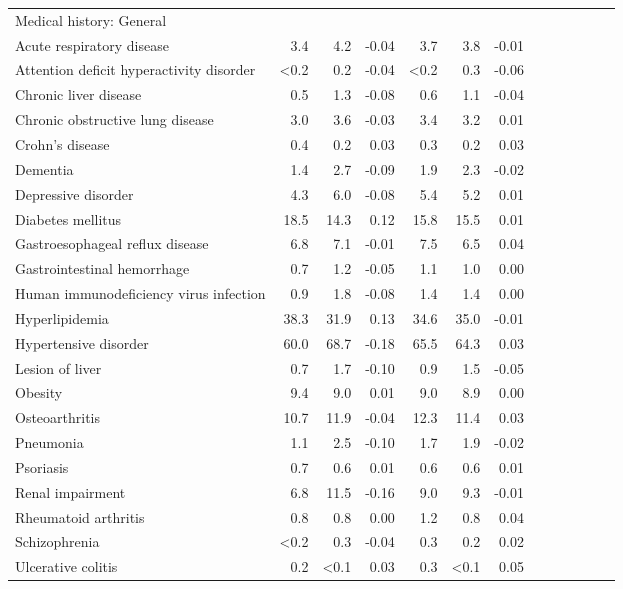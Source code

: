\documentclass[11pt,]{article}
\begin{document}
\begin{longtable}{lrrrrrrrrrrrr}
  Medical history: General &    &    &     &    &    &     \\ 
      Acute respiratory disease &  3.4 &  4.2 & -0.04 &  3.7 &  3.8 & -0.01 \\ 
      Attention deficit hyperactivity disorder & <0.2 &  0.2 & -0.04 & <0.2 &  0.3 & -0.06 \\ 
      Chronic liver disease &  0.5 &  1.3 & -0.08 &  0.6 &  1.1 & -0.04 \\ 
      Chronic obstructive lung disease &  3.0 &  3.6 & -0.03 &  3.4 &  3.2 &  0.01 \\ 
      Crohn's disease &  0.4 &  0.2 &  0.03 &  0.3 &  0.2 &  0.03 \\ 
      Dementia &  1.4 &  2.7 & -0.09 &  1.9 &  2.3 & -0.02 \\ 
      Depressive disorder &  4.3 &  6.0 & -0.08 &  5.4 &  5.2 &  0.01 \\ 
      Diabetes mellitus & 18.5 & 14.3 &  0.12 & 15.8 & 15.5 &  0.01 \\ 
      Gastroesophageal reflux disease &  6.8 &  7.1 & -0.01 &  7.5 &  6.5 &  0.04 \\ 
      Gastrointestinal hemorrhage &  0.7 &  1.2 & -0.05 &  1.1 &  1.0 &  0.00 \\ 
      Human immunodeficiency virus infection &  0.9 &  1.8 & -0.08 &  1.4 &  1.4 &  0.00 \\ 
      Hyperlipidemia & 38.3 & 31.9 &  0.13 & 34.6 & 35.0 & -0.01 \\ 
      Hypertensive disorder & 60.0 & 68.7 & -0.18 & 65.5 & 64.3 &  0.03 \\ 
      Lesion of liver &  0.7 &  1.7 & -0.10 &  0.9 &  1.5 & -0.05 \\ 
      Obesity &  9.4 &  9.0 &  0.01 &  9.0 &  8.9 &  0.00 \\ 
      Osteoarthritis & 10.7 & 11.9 & -0.04 & 12.3 & 11.4 &  0.03 \\ 
      Pneumonia &  1.1 &  2.5 & -0.10 &  1.7 &  1.9 & -0.02 \\ 
      Psoriasis &  0.7 &  0.6 &  0.01 &  0.6 &  0.6 &  0.01 \\ 
      Renal impairment &  6.8 & 11.5 & -0.16 &  9.0 &  9.3 & -0.01 \\ 
      Rheumatoid arthritis &  0.8 &  0.8 &  0.00 &  1.2 &  0.8 &  0.04 \\ 
      Schizophrenia & <0.2 &  0.3 & -0.04 &  0.3 &  0.2 &  0.02 \\ 
      Ulcerative colitis &  0.2 & <0.1 &  0.03 &  0.3 & <0.1 &  0.05 \\ 

\end{longtable}
\end{document}
